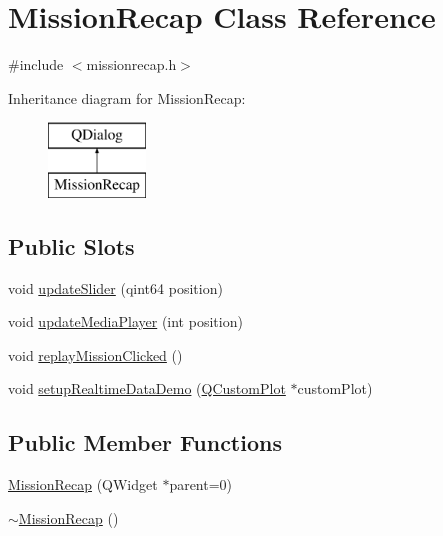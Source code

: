\hypertarget{class_mission_recap}{}\section{Mission\+Recap Class Reference}
\label{class_mission_recap}


{\ttfamily \#include $<$missionrecap.\+h$>$}

Inheritance diagram for Mission\+Recap\+:\begin{figure}[H]
\begin{center}
\leavevmode
\includegraphics[height=2.000000cm]{class_mission_recap}
\end{center}
\end{figure}
\subsection*{Public Slots}
\begin{DoxyCompactItemize}
\item 
void \hyperlink{class_mission_recap_a47eb36c2cc172358a0367dee72b1740f}{update\+Slider} (qint64 position)
\item 
void \hyperlink{class_mission_recap_a15ecf642246edadd1c09d81b93a6a4c5}{update\+Media\+Player} (int position)
\item 
void \hyperlink{class_mission_recap_ae719be21194bde9a725c20bd3ed8048f}{replay\+Mission\+Clicked} ()
\item 
void \hyperlink{class_mission_recap_a4d45a9fbe0fc9bdfd7e6033cfaa533f9}{setup\+Realtime\+Data\+Demo} (\hyperlink{class_q_custom_plot}{Q\+Custom\+Plot} $\ast$custom\+Plot)
\end{DoxyCompactItemize}
\subsection*{Public Member Functions}
\begin{DoxyCompactItemize}
\item 
\hyperlink{class_mission_recap_a7b516bd2925e4e0e2bc9f70072786b32}{Mission\+Recap} (Q\+Widget $\ast$parent=0)
\item 
\hyperlink{class_mission_recap_a7ebaee9824446e52e77083c65d41535b}{$\sim$\+Mission\+Recap} ()
\end{DoxyCompactItemize}



